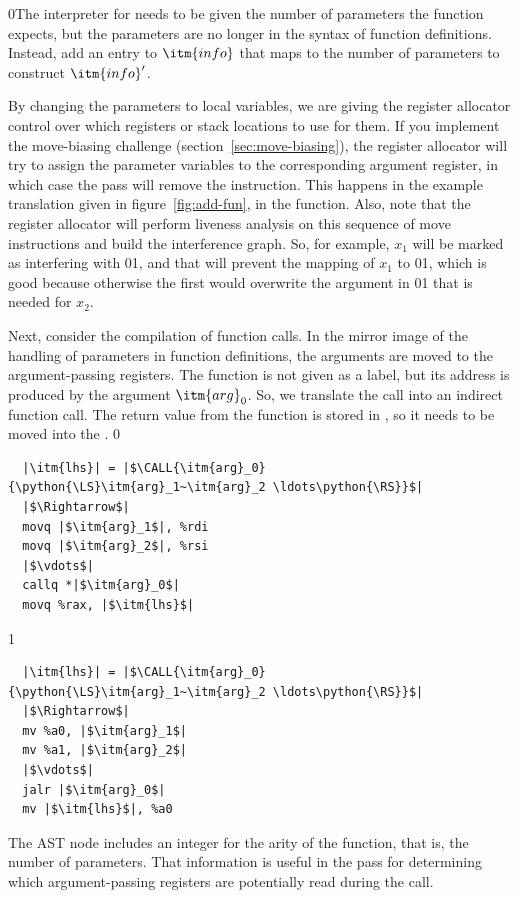 \documentclass[7x10]{TimesAPriori_MIT}%
\def\racketEd{0}
\def\pythonEd{1}
\def\edition{1}
\def\xeightysixEd{0}
\def\riscvEd{1}
\def\architecture{1}
\newcommand\ifriscv[1]{\if\architecture\riscvEd{#1}\fi}
\newcommand\ifxeightsix[1]{\if\architecture\xeightysixEd{#1}\fi}
\newcommand{\racket}[1]{{\if\edition\racketEd{#1}\fi}}
\newcommand{\pythonColor}[0]{}
\newcommand{\python}[1]{{\if\edition\pythonEd\pythonColor #1\fi}}
\numberwithin{theorem}{chapter}
\numberwithin{definition}{chapter}
\numberwithin{equation}{chapter}
\begin{document}
\racket{The interpreter for \LangXIndCall{} needs to be given the
  number of parameters the function expects, but the parameters are no
  longer in the syntax of function definitions. Instead, add an entry
  to $\itm{info}$ that maps \code{num-params} to the number of
  parameters to construct $\itm{info}'$.}

By changing the parameters to local variables, we are giving the
register allocator control over which registers or stack locations to
use for them. If you implement the move-biasing challenge
(section~\ref{sec:move-biasing}), the register allocator will try to
assign the parameter variables to the corresponding argument register,
in which case the  pass will remove the
{\IMOVE} instruction. This happens in the example translation given
in figure~\ref{fig:add-fun}, in
the  function.
%
Also, note that the register allocator will perform liveness analysis
on this sequence of move instructions and build the interference
graph. So, for example, $x_1$ will be marked as interfering with
\ifxeightsix{}\ifriscv{}, and that will prevent the mapping of $x_1$ to \ifxeightsix{}\ifriscv{},
which is good because otherwise the first {\IMOVE} would overwrite
the argument in \ifxeightsix{}\ifriscv{} that is needed for $x_2$.

Next, consider the compilation of function calls. In the mirror image
of the handling of parameters in function definitions, the arguments
are moved to the argument-passing registers.  The function
is not given as a label, but its address is produced by the argument
$\itm{arg}_0$. So, we translate the call into an indirect function
call. The return value from the function is stored in {\RAX}, so
it needs to be moved into the .
\if\architecture\xeightysixEd
\begin{lstlisting}
  |\itm{lhs}| = |$\CALL{\itm{arg}_0}{\python{\LS}\itm{arg}_1~\itm{arg}_2 \ldots\python{\RS}}$|
  |$\Rightarrow$|
  movq |$\itm{arg}_1$|, %rdi
  movq |$\itm{arg}_2$|, %rsi
  |$\vdots$|
  callq *|$\itm{arg}_0$|
  movq %rax, |$\itm{lhs}$|
\end{lstlisting}
\fi
\if\architecture\riscvEd
\begin{lstlisting}
  |\itm{lhs}| = |$\CALL{\itm{arg}_0}{\python{\LS}\itm{arg}_1~\itm{arg}_2 \ldots\python{\RS}}$|
  |$\Rightarrow$|
  mv %a0, |$\itm{arg}_1$|
  mv %a1, |$\itm{arg}_2$|
  |$\vdots$|
  jalr |$\itm{arg}_0$|
  mv |$\itm{lhs}$|, %a0
\end{lstlisting}
\fi
The  AST node includes an integer for the arity of
the function, that is, the number of parameters. That information is
useful in the  pass for determining which
argument-passing registers are potentially read during the call.
\end{document}
